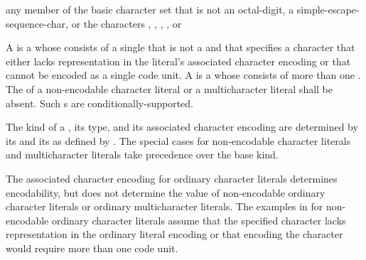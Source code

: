 \begin{bnf}
\br
    \textnormal{any member of the basic character set that is not an} octal-digit\textnormal{, a} simple-escape-sequence-char\textnormal{, or the characters , , , , or }
\end{bnf}

\pnum
{}%
%
%
%
%
%
%
%
%
%
A 
is a 
whose  consists of a single 
that is not a  and
that specifies a character
that either lacks representation in the literal's associated character encoding
or that cannot be encoded as a single code unit.
A  is a 
whose  consists of
more than one .
The  of
a non-encodable character literal or a multicharacter literal
shall be absent.
Such s are conditionally-supported.

\pnum
The kind of a ,
its type, and its associated character encoding
are determined by
its  and its 
as defined by .
The special cases for
non-encodable character literals and multicharacter literals
take precedence over the base kind.
\begin{note}
The associated character encoding for ordinary character literals
determines encodability,
but does not determine the value of
non-encodable ordinary character literals or
ordinary multicharacter literals.
The examples in 
for non-encodable ordinary character literals assume that
the specified character lacks representation in
the ordinary literal encoding or
that encoding the character would require more than one code unit.
\end{note}

